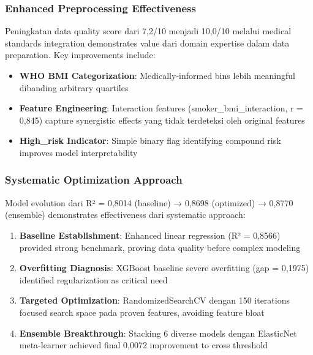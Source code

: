 \subsubsection{Enhanced Preprocessing Effectiveness}

Peningkatan data quality score dari 7,2/10 menjadi 10,0/10 melalui medical standards integration demonstrates value dari domain expertise dalam data preparation. Key improvements include:

\begin{itemize}
    \item \textbf{WHO BMI Categorization}: Medically-informed bins lebih meaningful dibanding arbitrary quartiles
    \item \textbf{Feature Engineering}: Interaction features (smoker\_bmi\_interaction, r = 0,845) capture synergistic effects yang tidak terdeteksi oleh original features
    \item \textbf{High\_risk Indicator}: Simple binary flag identifying compound risk improves model interpretability
\end{itemize}

\subsubsection{Systematic Optimization Approach}

Model evolution dari R² = 0,8014 (baseline) → 0,8698 (optimized) → 0,8770 (ensemble) demonstrates effectiveness dari systematic approach:

\begin{enumerate}
    \item \textbf{Baseline Establishment}: Enhanced linear regression (R² = 0,8566) provided strong benchmark, proving data quality before complex modeling

    \item \textbf{Overfitting Diagnosis}: XGBoost baseline severe overfitting (gap = 0,1975) identified regularization as critical need

    \item \textbf{Targeted Optimization}: RandomizedSearchCV dengan 150 iterations focused search space pada proven features, avoiding feature bloat

    \item \textbf{Ensemble Breakthrough}: Stacking 6 diverse models dengan ElasticNet meta-learner achieved final 0,0072 improvement to cross threshold
\end{enumerate}

